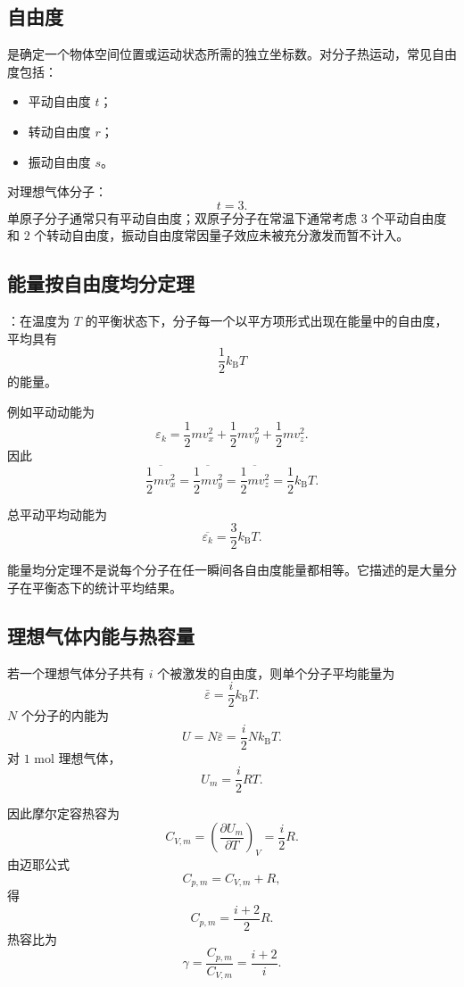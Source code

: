 \subsection{自由度}

是确定一个物体空间位置或运动状态所需的独立坐标数。对分子热运动，常见自由度包括：
\begin{itemize}
  \item 平动自由度 \(t\)；
  \item 转动自由度 \(r\)；
  \item 振动自由度 \(s\)。
\end{itemize}

对理想气体分子：
\[
  t=3.
\]
单原子分子通常只有平动自由度；双原子分子在常温下通常考虑 \(3\) 个平动自由度和 \(2\) 个转动自由度，振动自由度常因量子效应未被充分激发而暂不计入。

\subsection{能量按自由度均分定理}

：在温度为 \(T\) 的平衡状态下，分子每一个以平方项形式出现在能量中的自由度，平均具有
\[
  \boxed{
  \frac12 k_{\mathrm B}T
  }
\]
的能量。

例如平动动能为
\[
  \varepsilon_k=
  \frac12mv_x^2+
  \frac12mv_y^2+
  \frac12mv_z^2.
\]
因此
\[
  \overline{\frac12mv_x^2}
  =
  \overline{\frac12mv_y^2}
  =
  \overline{\frac12mv_z^2}
  =
  \frac12k_{\mathrm B}T.
\]

总平动平均动能为
\[
  \overline{\varepsilon_k}
  =
  \frac32k_{\mathrm B}T.
\]

\begin{WarnBox}[能量均分定理是统计规律]
能量均分定理不是说每个分子在任一瞬间各自由度能量都相等。它描述的是大量分子在平衡态下的统计平均结果。
\end{WarnBox}

\subsection{理想气体内能与热容量}

若一个理想气体分子共有 \(i\) 个被激发的自由度，则单个分子平均能量为
\[
  \bar\varepsilon=\frac{i}{2}k_{\mathrm B}T.
\]
\(N\) 个分子的内能为
\[
  U=N\bar\varepsilon
  =
  \frac{i}{2}Nk_{\mathrm B}T.
\]
对 \(1\) mol 理想气体，
\[
  U_m=\frac{i}{2}RT.
\]

因此摩尔定容热容为
\[
  \boxed{
  C_{V,m}=\left(\frac{\partial U_m}{\partial T}\right)_V
  =
  \frac{i}{2}R
  }.
\]
由迈耶公式
\[
  C_{p,m}=C_{V,m}+R,
\]
得
\[
  \boxed{
  C_{p,m}=\frac{i+2}{2}R
  }.
\]
热容比为
\[
  \boxed{
  \gamma=\frac{C_{p,m}}{C_{V,m}}=\frac{i+2}{i}
  }.
\]

